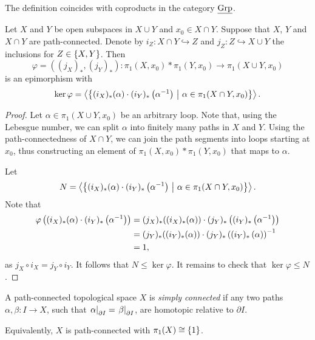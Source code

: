 \begin{opomba}
The definition coincides with coproducts in the category
$\underline{\operatorname{Grp}}$.
\end{opomba}

\begin{izrek}
Let $X$ and $Y$ be open subspaces in $X \cup Y$ and
$x_0 \in X \cap Y$. Suppose that $X$, $Y$ and $X \cap Y$ are
path-connected. Denote by $i_Z \colon X \cap Y \hookrightarrow Z$
and $j_Z \colon Z \hookrightarrow X \cup Y$ the inclusions for
$Z \in \left\{X, Y\right\}$. Then
\[
\varphi = ((j_X)_*, (j_Y)_*) \colon
\pi_1(X, x_0) * \pi_1(Y, x_0) \to \pi_1(X \cup Y, x_0)
\]
is an epimorphism with
\[
\ker \varphi =
\left\langle \left\{(i_X)_*(\alpha) \cdot (i_Y)_* \left(\alpha^{-1}\right)~\middle\vert~\alpha \in \pi_1(X \cap Y, x_0)\right\}\right\rangle.
\]
\end{izrek}

\begin{proof}
Let $\alpha \in \pi_1(X \cup Y, x_0)$ be an arbitrary loop. Note
that, using the Lebesgue number, we can split $\alpha$ into
finitely many paths in $X$ and $Y$. Using the path-connectedness of
$X \cap Y$, we can join the path segments into loops starting at
$x_0$, thus constructing an element of
$\pi_1(X, x_0) * \pi_1(Y, x_0)$ that maps to $\alpha$.

Let
\[
N = \left\langle \left\{(i_X)_*(\alpha) \cdot (i_Y)_*\left(\alpha^{-1}\right)~\middle\vert~\alpha \in \pi_1(X \cap Y, x_0)\right\}\right\rangle.
\]
Note that
\begin{align*}
\varphi \left((i_X)_*(\alpha) \cdot (i_Y)_*\left(\alpha^{-1}\right)\right) &=
(j_X)_*((i_X)_*(\alpha)) \cdot (j_Y)_* \left((i_Y)_*\left(\alpha^{-1}\right)\right)
\\
&=
(j_Y)_*((i_Y)_*(\alpha)) \cdot (j_Y)_* \left((i_Y)_*\left(\alpha\right)\right)^{-1}
\\
&=
1,
\end{align*}
as $j_X \circ i_X = j_Y \circ i_Y$. It follows that
$N \leq \ker \varphi$. It remains to check that
$\ker \varphi \leq N$.
\end{proof}

\begin{definicija}
A path-connected topological space $X$ is
\emph{simply connected} if any two paths
$\alpha, \beta \colon I \to X$, such that
$\left. \alpha\right|_{\partial I}^{} = \left. \beta\right|_{\partial I}^{}$, are
homotopic relative to $\partial I$.
\end{definicija}

\begin{opomba}
Equivalently, $X$ is path-connected with $\pi_1(X) \cong \left\{1\right\}$.
\end{opomba}

